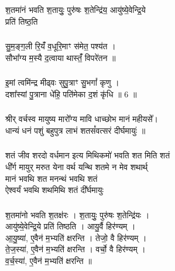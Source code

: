 \subsubsection{}
श॒तमा॑नं भवति श॒तायुः॒ पुरु॑षः श॒तेन्द्रि॑य॒ आयु॑ष्ये॒वेन्द्रि॒ये\\
प्रति॑ तिष्ठ॒ति\\
\subsubsection{}
सु॒म॒ङ्ग॒ली रि॒यंँ व॒धूरि॒माꣳ स॑मेत॒ पश्य॑त ।\\
सौभा᳚ग्य म॒स्यै द॒त्वाया थास्तंँ॒ विपरे॑तन ॥\\
\subsubsection{}
इ॒मां त्वमि॑न्द्र मीढ्वः सुपु॒त्राꣳ सु॒भगां᳚ कृणु ।\\
दशा᳚स्यां पु॒त्राना धे॑हि॒ पति॑मेका द॒शं कृ॑धि ॥ 6 ॥\\
\subsubsection{}
श्रीर् वर्चस्व मायुष्य मारो᳚ग्य मावि धाच्छोभ मानं महीयसे᳚।\\
धान्यं धनं पशुं बहुपुत्र लाभं शतसं᳚वत्सरं दीर्घमायुः॑ ॥\\
\subsubsection{}
शतं जीव शरदो वर्धमान इत्य मिथिकमो॑ भवति शत मिति शतं\\
धी᳚र्ग मायुर् मरुत येना वर्थ यन्थि शतमे न मेव शथार्थ्\\
मानं भवथि शत मनन्थं भवथि शतं\\
ऐश्वर्यं भवथि  शथमिथि शतं दी᳚र्घमायुः\\
\subsubsection{}
श॒तमा॑नो भवति श॒तक्ष॑रः । श॒तायुः॒ पुरु॑षः श॒तेन्द्रि॑यः ।\\
आयु॑ष्ये॒वेन्द्रि॒ये प्रति॑ तिष्ठति । आयु॒र्वै हिर॑ण्यम् ।\\
आ॒यु॒ष्या॑, ए॒वैन॑ म॒भ्यति॑ क्षरन्ति । तेजो॒ वै हिर॑ण्यम् ।\\
ते॒ज॒स्या॑, ए॒वैन॑ म॒भ्यति॑ क्षरन्ति । वर्चो॒ वै हिर॑ण्यम् ।\\
व॒र्च॒स्या॑, ए॒वैन॑ म॒भ्यति॑ क्षरन्ति ॥\\
